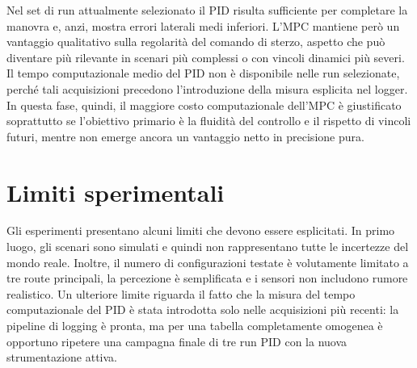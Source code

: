 Nel set di run attualmente selezionato il PID risulta sufficiente per completare la manovra e, anzi, mostra errori laterali medi inferiori. L'MPC mantiene però un vantaggio qualitativo sulla regolarità del comando di sterzo, aspetto che può diventare più rilevante in scenari più complessi o con vincoli dinamici più severi. Il tempo computazionale medio del PID non è disponibile nelle run selezionate, perché tali acquisizioni precedono l'introduzione della misura esplicita nel logger. In questa fase, quindi, il maggiore costo computazionale dell'MPC è giustificato soprattutto se l'obiettivo primario è la fluidità del controllo e il rispetto di vincoli futuri, mentre non emerge ancora un vantaggio netto in precisione pura.

\section{Limiti sperimentali}

Gli esperimenti presentano alcuni limiti che devono essere esplicitati. In primo luogo, gli scenari sono simulati e quindi non rappresentano tutte le incertezze del mondo reale. Inoltre, il numero di configurazioni testate è volutamente limitato a tre route principali, la percezione è semplificata e i sensori non includono rumore realistico. Un ulteriore limite riguarda il fatto che la misura del tempo computazionale del PID è stata introdotta solo nelle acquisizioni più recenti: la pipeline di logging è pronta, ma per una tabella completamente omogenea è opportuno ripetere una campagna finale di tre run PID con la nuova strumentazione attiva.
